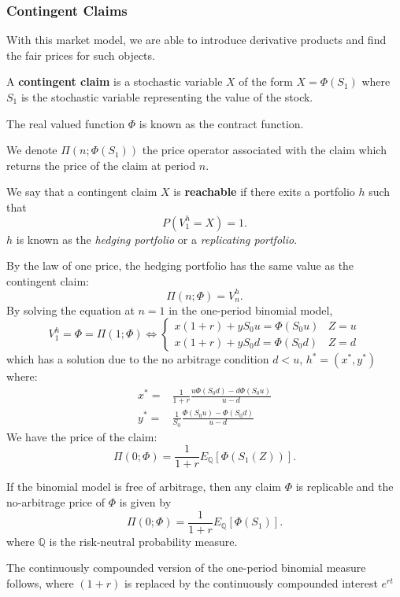 \subsubsection{Contingent Claims}
With this market model, we are able to introduce derivative products and find the
fair prices for such objects.
\begin{definition}
  A \textbf{contingent claim} is a stochastic variable $X$ of the form
  $X=\Phi(S_1)$ where $S_1$ is the stochastic variable representing the value
  of the stock.
\end{definition}
The real valued function $\Phi$ is known as the contract function.
\begin{notation}
  We denote $\Pi\left( n;\Phi\left( S_1 \right)  \right) $ the price operator
  associated with the claim which returns the price of the claim at period $n$.
\end{notation}
\begin{definition}
  We say that a contingent claim $X$ is \textbf{reachable} if there exits a portfolio
  $h$ such that
  \[P(V_1^{h}=X)=1.\]
  $h$ is known as the \textit{hedging portfolio} or a \textit{replicating
  portfolio}.
\end{definition}
By the law of one price, the hedging portfolio has the same value as the contingent claim:
\[\Pi\left( n;\Phi \right) =V_{n}^{h}.\]
By solving the equation at $n=1$ in the one-period binomial model,
\[V_1^{h}=\Phi=\Pi\left( 1;\Phi \right) \iff
  \begin{cases}x(1+r)+yS_0u=\Phi(S_0u)&Z=u\\x(1+r)+yS_0d=\Phi(S_0d)&Z=d\end{cases}\] 
which has a solution due to the no arbitrage condition $d<u$, $h^{*}=\left( x^{*},y^{*} \right) $ where:
\begin{align*}
  x^{*}=&\frac{1}{1+r}\frac{u\Phi\left( S_0d \right) -d\Phi\left( S_0u \right) }{u-d}\\
  y^{*}=&\frac{1}{S_0}\frac{\Phi\left( S_0u \right) -\Phi\left( S_0d \right) }{u-d}
\end{align*}
We have the price of the claim:
\[\Pi\left( 0;\Phi \right)=\frac{1}{1+r}E_{\mathbb{Q}}\left[  \Phi\left( S_1(Z) \right) \right].\] 
\begin{theorem}
  If the binomial model is free of arbitrage, then any claim $\Phi$ is replicable and
  the no-arbitrage price of $\Phi$ is given by
  \[\Pi\left( 0;\Phi \right)=\frac{1}{1+r}E_{\mathbb{Q}}\left[  \Phi\left( S_1\right) \right].\]
  where $\mathbb{Q}$ is the risk-neutral probability measure.
\end{theorem}
\begin{remark}
  The continuously compounded version of the one-period binomial measure
  follows, where $(1+r)$ is replaced by the continuously compounded interest
  $e^{rt}$
\end{remark}
